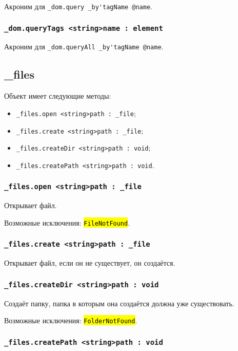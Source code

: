 \documentclass[a4paper, 14pt]{extarticle}
\newcommand{\ferror}[1]{{\fontsize{11pt}{12pt}\tt{\sethlcolor{yellow}\hl{#1}}}}
\newenvironment{icItems}
	{ \begin{itemize} [noitemsep,nolistsep] }
	{ \end{itemize} }
\begin{document}
Акроним для \lstinline|_dom.query _by'tagName @name|.

\subsubsection{\lstinline|_dom.queryTags <string>name : element|}

Акроним для \lstinline|_dom.queryAll _by'tagName @name|.

\subsection{{\color{orange} \_files}}

Объект \files{} имеет следующие методы:
\begin{icItems}
	\item \lstinline|_files.open <string>path : _file|;
	\item \lstinline|_files.create <string>path : _file|;
	\item \lstinline|_files.createDir <string>path : void|;
	\item \lstinline|_files.createPath <string>path : void|.
\end{icItems}

\subsubsection{\lstinline|_files.open <string>path : _file|}

Открывает файл.

Возможные исключения: \ferror{FileNotFound}.

\subsubsection{\lstinline|_files.create <string>path : _file|}

Открывает файл, если он не существует, он создаётся.

\subsubsection{\lstinline|_files.createDir <string>path : void|}

Создаёт папку, папка в которым она создаётся должна уже существовать.

Возможные исключения: \ferror{FolderNotFound}.

\subsubsection{\lstinline|_files.createPath <string>path : void|}
\end{document}
